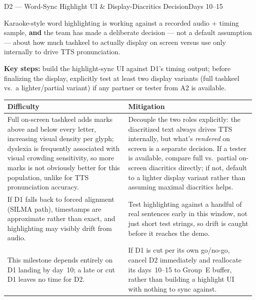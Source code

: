 \documentclass[11pt,a4paper]{article}
\begin{document}
\newpage
\begin{milestonehead}{D2 --- Word-Sync Highlight UI \& Display-Diacritics Decision}{Days 10--15}
\begin{goalbox}
Karaoke-style word highlighting is working against a recorded audio +
timing sample, \textbf{and} the team has made a deliberate decision --- not
a default assumption --- about how much tashkeel to actually display on
screen versus use only internally to drive TTS pronunciation.
\end{goalbox}

\textbf{Key steps:} build the highlight-sync UI against D1's timing output;
before finalizing the display, explicitly test at least two display
variants (full tashkeel vs.\ a lighter/partial variant) if any partner or
tester from A2 is available.

\begin{center}
\small
\begin{tabular}{@{}p{6.3cm}p{6.9cm}@{}}
\toprule
\textbf{Difficulty} & \textbf{Mitigation} \\
\midrule
Full on-screen tashkeel adds marks above and below every letter, increasing
visual density per glyph; dyslexia is frequently associated with visual
crowding sensitivity, so more marks is not obviously better for this
population, unlike for TTS pronunciation accuracy. & Decouple the two roles
explicitly: the diacritized text always drives TTS internally, but what's
\emph{rendered} on screen is a separate decision. If a tester is available,
compare full vs.\ partial on-screen diacritics directly; if not, default to
a lighter display variant rather than assuming maximal diacritics helps. \\
\addlinespace
If D1 falls back to forced alignment (SILMA path), timestamps are
approximate rather than exact, and highlighting may visibly drift from
audio. & Test highlighting against a handful of real sentences early in
this window, not just short test strings, so drift is caught before it
reaches the demo. \\
\addlinespace
This milestone depends entirely on D1 landing by day~10; a late or cut D1
leaves no time for D2. & If D1 is cut per its own go/no-go, cancel D2
immediately and reallocate its days~10--15 to Group~E buffer, rather than
building a highlight UI with nothing to sync against. \\
\bottomrule
\end{tabular}
\end{center}
\end{milestonehead}
\end{document}
